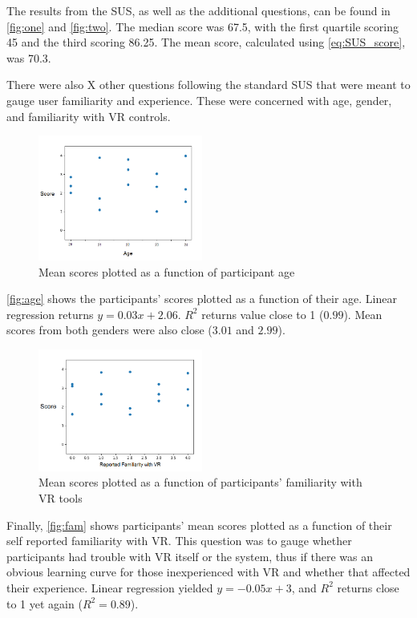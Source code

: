 The results from the SUS, as well as the additional questions, can be found in \autoref{fig:one} and \autoref{fig:two}.
The median score was 67.5, with the first quartile scoring 45 and the third scoring 86.25. The mean score, calculated using \autoref{eq:SUS_score}, was 70.3. %

There were also X other questions following the standard SUS that were meant to gauge user familiarity and experience. These were concerned with age, gender, and familiarity with VR controls. 

\begin{figure}
	\centering
	\includegraphics[width = 0.48\textwidth]{age.png}
	\caption{Mean scores plotted as a function of participant age}
	\label{fig:age}
\end{figure}

\autoref{fig:age} shows the participants' scores plotted as a function of their age. Linear regression returns $y = 0.03x + 2.06$. $R^2$ returns value close to 1 ($0.99$). Mean scores from both genders were also close ($ 3.01 $ and $ 2.99 $). 

\begin{figure}
	\centering
	\includegraphics[width = 0.48\textwidth]{Familiarity.png}
	\caption{Mean scores plotted as a function of participants' familiarity with VR tools}
	\label{fig:fam}
\end{figure}

Finally, \autoref{fig:fam} shows participants' mean scores plotted as a function of their self reported familiarity with VR. This question was to gauge whether participants had trouble with VR itself or the system, thus if there was an obvious learning curve for those inexperienced with VR and whether that affected their experience. Linear regression yielded $y = -0.05x + 3$, and $R^2$ returns close to 1 yet again ($R^2=0.89$).
